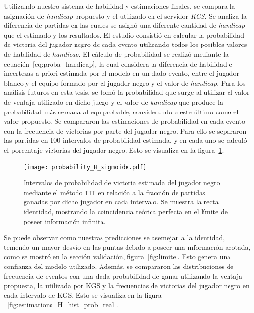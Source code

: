 \documentclass[11pt,twoside,spanish]{report} %
\begin{document}
Utilizando nuestro sistema de habilidad y estimaciones finales,  se compara la asignaci\'on de \textit{handicap} propuesto y el utilizado en el servidor \textit{KGS}.
Se analiza la diferencia de partidas en las cuales se asign\'o una diferente cantidad de \textit{handicap} que el estimado y los resultados.
El estudio consisti\'o en calcular la probabilidad de victoria del jugador negro de cada evento utilizando todos los posibles valores de habilidad de \textit{handicap}.
El c\'alculo de probabilidad se realiz\'o mediante la ecuaci\'on~\ref{eq:proba_handicap}, la cual considera la diferencia de habilidad e incertezas a priori estimada por el modelo en un dado evento, entre el jugador blanco y el equipo formado por el jugador negro y el valor de \textit{handicap}.
Para los an\'alisis futuros en esta tesis, se tom\'o la probabilidad que surge al utilizar el valor de ventaja utilizado en dicho juego y el valor de \textit{handicap} que produce la probabilidad m\'as cercana al equiprobable, considerando a este \'ultimo como el valor propuesto.
Se compararon las estimaciones de probabilidad en cada evento con la frecuencia de victorias por parte del jugador negro.
Para ello se separaron las partidas en 100 intervalos de probabilidad estimada, y en cada uno se calcul\'o el porcentaje victorias del jugador negro.
Esto se visualiza en la figura~\ref{fig:estimations_H_sigmoide}.


\begin{figure}[H]
	\centering
	\texttt{[image: probability\_H\_sigmoide.pdf]}
	\caption{Intervalos de probabilidad de victoria estimada del jugador negro  mediante el m\'etodo \texttt{TTT} en relaci\'on a la fracci\'on de partidas ganadas por dicho jugador en cada intervalo. Se muestra la recta identidad, mostrando la coincidencia te\'orica perfecta en el l\'imite de poseer informaci\'on infinita.}
	\label{fig:estimations_H_sigmoide}
\end{figure}


Se puede observar como nuestras predicciones se asemejan a la identidad, teniendo un mayor desv\'io en las puntas  debido a poseer una informaci\'on acotada, como se mostr\'o en la secci\'on validaci\'on, figura~\ref{fig:limite}.
Esto genera una confianza del modelo utilizado.
Adem\'as, se compararon las distribuciones de frecuencia de eventos con una dada probabilidad de ganar utilizando la ventaja propuesta, la utilizada por KGS y  la frecuencias de victorias del jugador negro en cada intervalo de KGS.
Esto se visualiza en la figura ~\ref{fig:estimations_H_hist_prob_real}.
\end{document}
